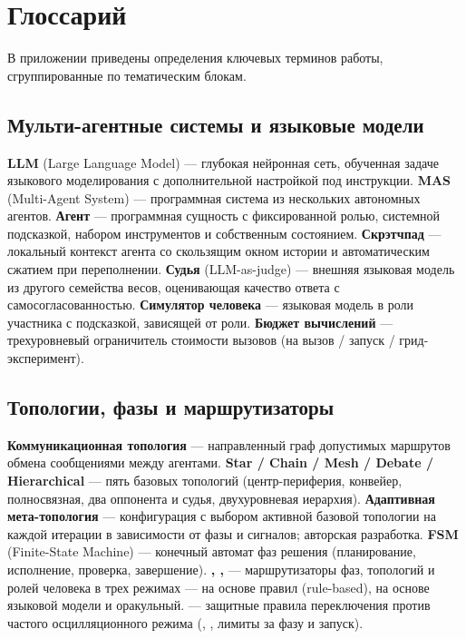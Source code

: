 
\clearpage
\section{Глоссарий}
\label{app:glossary}

В приложении приведены определения ключевых терминов работы,
сгруппированные по тематическим блокам.

\begingroup
\small

\subsection*{Мульти-агентные системы и языковые модели}

\noindent\textbf{LLM} (Large Language Model) --- глубокая
нейронная сеть, обученная задаче языкового моделирования
с дополнительной настройкой под инструкции.\quad
\textbf{MAS} (Multi-Agent System) --- программная система из
нескольких автономных агентов.\quad
\textbf{Агент} --- программная сущность с фиксированной ролью,
системной подсказкой, набором инструментов и собственным
состоянием.\quad
\textbf{Скрэтчпад} --- локальный контекст агента со скользящим
окном истории и автоматическим сжатием при переполнении.\quad
\textbf{Судья} (LLM-as-judge) --- внешняя языковая модель из
другого семейства весов, оценивающая качество ответа с
самосогласованностью.\quad
\textbf{Симулятор человека} --- языковая модель в роли участника
с подсказкой, зависящей от роли.\quad
\textbf{Бюджет вычислений} --- трехуровневый ограничитель
стоимости вызовов (на вызов / запуск / грид-эксперимент).

\subsection*{Топологии, фазы и маршрутизаторы}

\noindent\textbf{Коммуникационная топология} --- направленный
граф допустимых маршрутов обмена сообщениями между агентами.\quad
\textbf{Star / Chain / Mesh / Debate / Hierarchical} --- пять
базовых топологий (центр-периферия, конвейер, полносвязная,
два оппонента и судья, двухуровневая иерархия).\quad
\textbf{Адаптивная мета-топология} --- конфигурация с выбором
активной базовой топологии на каждой итерации в зависимости
от фазы и сигналов; авторская разработка.\quad
\textbf{FSM} (Finite-State Machine) --- конечный автомат фаз
решения (планирование, исполнение, проверка, завершение).\quad
\textbf{, ,
} --- маршрутизаторы фаз, топологий и ролей
человека в трех режимах --- на основе правил (rule-based),
на основе языковой модели и оракульный.\quad
\textbf{} --- защитные правила переключения
против частого осцилляционного режима (,
, лимиты за фазу и запуск).

